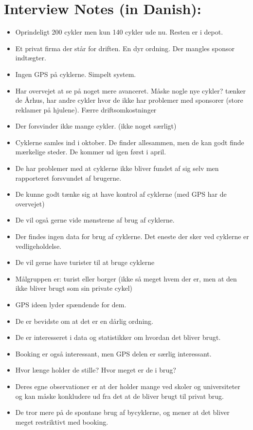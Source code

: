 \section{Interview Notes (in Danish):}

\begin{itemize}
\item Oprindeligt 200 cykler men kun 140 cykler ude nu. Resten er i depot.
\item Et privat firma der står for driften. En dyr ordning. Der mangles sponsor indtægter.
\item Ingen GPS på cyklerne. Simpelt system.
\item Har overvejet at se på noget mere avanceret. Måske nogle nye cykler? tænker de
Århus, har andre cykler hvor de ikke har problemer med sponsorer (store reklamer på hjulene). Færre driftsomkostninger
\item Der forsvinder ikke mange cykler. (ikke noget særligt)
\item Cyklerne samles ind i oktober. De finder allesammen, men de kan godt finde mærkelige steder. De kommer ud igen først i april.
\item De har problemer med at cyklerne ikke bliver fundet af sig selv men rapporteret forsvundet af brugerne.
\item De kunne godt tænke sig at have kontrol af cyklerne (med GPS har de overvejet)
\item De vil også gerne vide mønstrene af brug af cyklerne.
\item Der findes ingen data for brug af cyklerne. Det eneste der sker ved cyklerne er vedligeholdelse.
\item De vil gerne have turister til at bruge cyklerne
\item Målgruppen er: turist eller borger (ikke så meget hvem der er, men at den ikke bliver brugt som sin private cykel)
\item GPS ideen lyder spændende for dem.
\item De er bevidste om at det er en dårlig ordning.
\item De er interesseret i data og statistikker om hvordan det bliver brugt.
\item Booking er også interessant, men GPS delen er særlig interessant.
\item Hvor længe holder de stille? Hvor meget er de i brug?
\item Deres egne observationer er at der holder mange ved skoler og universiteter og kan måske konkludere ud fra det at de bliver brugt til privat brug.
\item De tror mere på de spontane brug af bycyklerne, og mener at det bliver meget restriktivt med booking.
\end{itemize}